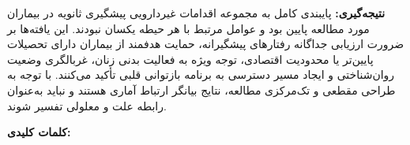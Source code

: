 \vspace{0.6em}
\noindent\textbf{نتیجه‌گیری:}
پایبندی کامل به مجموعه اقدامات غیردارویی پیشگیری ثانویه در بیماران مورد مطالعه پایین بود و عوامل مرتبط با هر حیطه یکسان نبودند. این یافته‌ها بر ضرورت ارزیابی جداگانه رفتارهای پیشگیرانه، حمایت هدفمند از بیماران دارای تحصیلات پایین‌تر یا محدودیت اقتصادی، توجه ویژه به فعالیت بدنی زنان، غربالگری وضعیت روان‌شناختی و ایجاد مسیر دسترسی به برنامه بازتوانی قلبی تأکید می‌کنند. با توجه به طراحی مقطعی و تک‌مرکزی مطالعه، نتایج بیانگر ارتباط آماری هستند و نباید به‌عنوان رابطه علت و معلولی تفسیر شوند.

\vspace{1em}
\noindent\textbf{کلمات کلیدی:} \KeywordsFA

\clearpage
